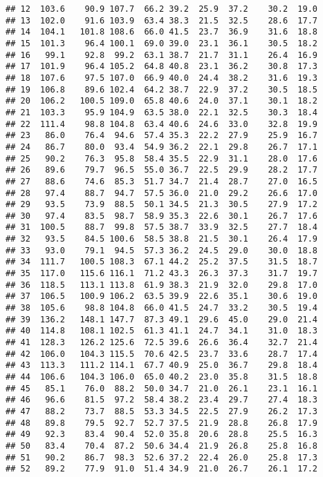 \documentclass[
]{book}
\theoremstyle{definition}
\theoremstyle{definition}
\theoremstyle{definition}
\theoremstyle{definition}
\theoremstyle{remark}
\begin{document}
\begin{verbatim}
## 12  103.6    90.9 107.7  66.2 39.2  25.9  37.2    30.2  19.0
## 13  102.0    91.6 103.9  63.4 38.3  21.5  32.5    28.6  17.7
## 14  104.1   101.8 108.6  66.0 41.5  23.7  36.9    31.6  18.8
## 15  101.3    96.4 100.1  69.0 39.0  23.1  36.1    30.5  18.2
## 16   99.1    92.8  99.2  63.1 38.7  21.7  31.1    26.4  16.9
## 17  101.9    96.4 105.2  64.8 40.8  23.1  36.2    30.8  17.3
## 18  107.6    97.5 107.0  66.9 40.0  24.4  38.2    31.6  19.3
## 19  106.8    89.6 102.4  64.2 38.7  22.9  37.2    30.5  18.5
## 20  106.2   100.5 109.0  65.8 40.6  24.0  37.1    30.1  18.2
## 21  103.3    95.9 104.9  63.5 38.0  22.1  32.5    30.3  18.4
## 22  111.4    98.8 104.8  63.4 40.6  24.6  33.0    32.8  19.9
## 23   86.0    76.4  94.6  57.4 35.3  22.2  27.9    25.9  16.7
## 24   86.7    80.0  93.4  54.9 36.2  22.1  29.8    26.7  17.1
## 25   90.2    76.3  95.8  58.4 35.5  22.9  31.1    28.0  17.6
## 26   89.6    79.7  96.5  55.0 36.7  22.5  29.9    28.2  17.7
## 27   88.6    74.6  85.3  51.7 34.7  21.4  28.7    27.0  16.5
## 28   97.4    88.7  94.7  57.5 36.0  21.0  29.2    26.6  17.0
## 29   93.5    73.9  88.5  50.1 34.5  21.3  30.5    27.9  17.2
## 30   97.4    83.5  98.7  58.9 35.3  22.6  30.1    26.7  17.6
## 31  100.5    88.7  99.8  57.5 38.7  33.9  32.5    27.7  18.4
## 32   93.5    84.5 100.6  58.5 38.8  21.5  30.1    26.4  17.9
## 33   93.0    79.1  94.5  57.3 36.2  24.5  29.0    30.0  18.8
## 34  111.7   100.5 108.3  67.1 44.2  25.2  37.5    31.5  18.7
## 35  117.0   115.6 116.1  71.2 43.3  26.3  37.3    31.7  19.7
## 36  118.5   113.1 113.8  61.9 38.3  21.9  32.0    29.8  17.0
## 37  106.5   100.9 106.2  63.5 39.9  22.6  35.1    30.6  19.0
## 38  105.6    98.8 104.8  66.0 41.5  24.7  33.2    30.5  19.4
## 39  136.2   148.1 147.7  87.3 49.1  29.6  45.0    29.0  21.4
## 40  114.8   108.1 102.5  61.3 41.1  24.7  34.1    31.0  18.3
## 41  128.3   126.2 125.6  72.5 39.6  26.6  36.4    32.7  21.4
## 42  106.0   104.3 115.5  70.6 42.5  23.7  33.6    28.7  17.4
## 43  113.3   111.2 114.1  67.7 40.9  25.0  36.7    29.8  18.4
## 44  106.6   104.3 106.0  65.0 40.2  23.0  35.8    31.5  18.8
## 45   85.1    76.0  88.2  50.0 34.7  21.0  26.1    23.1  16.1
## 46   96.6    81.5  97.2  58.4 38.2  23.4  29.7    27.4  18.3
## 47   88.2    73.7  88.5  53.3 34.5  22.5  27.9    26.2  17.3
## 48   89.8    79.5  92.7  52.7 37.5  21.9  28.8    26.8  17.9
## 49   92.3    83.4  90.4  52.0 35.8  20.6  28.8    25.5  16.3
## 50   83.4    70.4  87.2  50.6 34.4  21.9  26.8    25.8  16.8
## 51   90.2    86.7  98.3  52.6 37.2  22.4  26.0    25.8  17.3
## 52   89.2    77.9  91.0  51.4 34.9  21.0  26.7    26.1  17.2

\end{verbatim}
\end{document}
